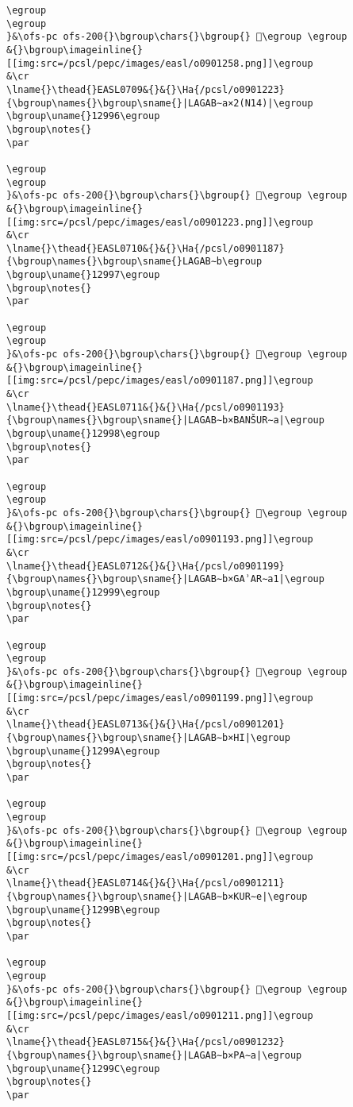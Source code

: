 \begin{verbatim}
\egroup
\egroup
}&\ofs-pc ofs-200{}\bgroup\chars{}\bgroup{} 𒦕\egroup \egroup
&{}\bgroup\imageinline{}[[img:src=/pcsl/pepc/images/easl/o0901258.png]]\egroup
&\cr
\lname{}\thead{}EASL0709&{}&{}\Ha{/pcsl/o0901223}{\bgroup\names{}\bgroup\sname{}|LAGAB∼a×2(N14)|\egroup
\bgroup\uname{}12996\egroup
\bgroup\notes{}
\par 

\egroup
\egroup
}&\ofs-pc ofs-200{}\bgroup\chars{}\bgroup{} 𒦖\egroup \egroup
&{}\bgroup\imageinline{}[[img:src=/pcsl/pepc/images/easl/o0901223.png]]\egroup
&\cr
\lname{}\thead{}EASL0710&{}&{}\Ha{/pcsl/o0901187}{\bgroup\names{}\bgroup\sname{}LAGAB∼b\egroup
\bgroup\uname{}12997\egroup
\bgroup\notes{}
\par 

\egroup
\egroup
}&\ofs-pc ofs-200{}\bgroup\chars{}\bgroup{} 𒦗\egroup \egroup
&{}\bgroup\imageinline{}[[img:src=/pcsl/pepc/images/easl/o0901187.png]]\egroup
&\cr
\lname{}\thead{}EASL0711&{}&{}\Ha{/pcsl/o0901193}{\bgroup\names{}\bgroup\sname{}|LAGAB∼b×BANŠUR∼a|\egroup
\bgroup\uname{}12998\egroup
\bgroup\notes{}
\par 

\egroup
\egroup
}&\ofs-pc ofs-200{}\bgroup\chars{}\bgroup{} 𒦘\egroup \egroup
&{}\bgroup\imageinline{}[[img:src=/pcsl/pepc/images/easl/o0901193.png]]\egroup
&\cr
\lname{}\thead{}EASL0712&{}&{}\Ha{/pcsl/o0901199}{\bgroup\names{}\bgroup\sname{}|LAGAB∼b×GAʾAR∼a1|\egroup
\bgroup\uname{}12999\egroup
\bgroup\notes{}
\par 

\egroup
\egroup
}&\ofs-pc ofs-200{}\bgroup\chars{}\bgroup{} 𒦙\egroup \egroup
&{}\bgroup\imageinline{}[[img:src=/pcsl/pepc/images/easl/o0901199.png]]\egroup
&\cr
\lname{}\thead{}EASL0713&{}&{}\Ha{/pcsl/o0901201}{\bgroup\names{}\bgroup\sname{}|LAGAB∼b×HI|\egroup
\bgroup\uname{}1299A\egroup
\bgroup\notes{}
\par 

\egroup
\egroup
}&\ofs-pc ofs-200{}\bgroup\chars{}\bgroup{} 𒦚\egroup \egroup
&{}\bgroup\imageinline{}[[img:src=/pcsl/pepc/images/easl/o0901201.png]]\egroup
&\cr
\lname{}\thead{}EASL0714&{}&{}\Ha{/pcsl/o0901211}{\bgroup\names{}\bgroup\sname{}|LAGAB∼b×KUR∼e|\egroup
\bgroup\uname{}1299B\egroup
\bgroup\notes{}
\par 

\egroup
\egroup
}&\ofs-pc ofs-200{}\bgroup\chars{}\bgroup{} 𒦛\egroup \egroup
&{}\bgroup\imageinline{}[[img:src=/pcsl/pepc/images/easl/o0901211.png]]\egroup
&\cr
\lname{}\thead{}EASL0715&{}&{}\Ha{/pcsl/o0901232}{\bgroup\names{}\bgroup\sname{}|LAGAB∼b×PA∼a|\egroup
\bgroup\uname{}1299C\egroup
\bgroup\notes{}
\par 


\end{verbatim}
